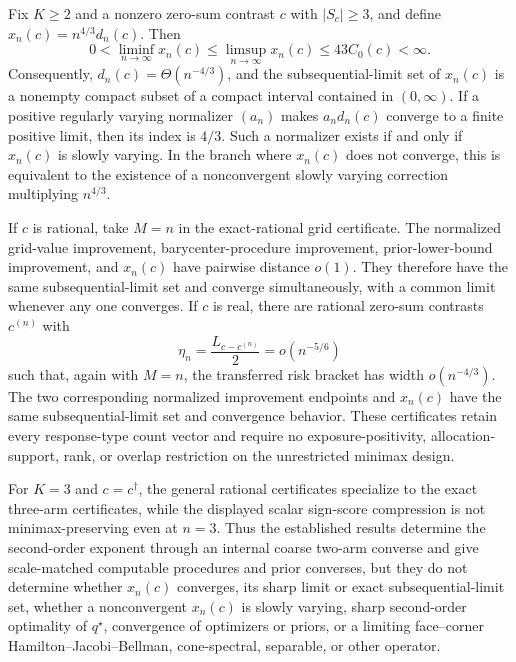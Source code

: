 Fix \(K\geq2\) and a nonzero zero-sum contrast \(c\) with \(|S_c|\geq3\), and define \(x_n(c)=n^{4/3}d_n(c)\). Then
\[
 0<\liminf_{n\to\infty}x_n(c)
 \leq\limsup_{n\to\infty}x_n(c)
 \leq43C_0(c)<\infty.
\]
Consequently, \(d_n(c)=\Theta(n^{-4/3})\), and the subsequential-limit set of \(x_n(c)\) is a nonempty compact subset of a compact interval contained in \((0,\infty)\). If a positive regularly varying normalizer \((a_n)\) makes \(a_nd_n(c)\) converge to a finite positive limit, then its index is \(4/3\). Such a normalizer exists if and only if \(x_n(c)\) is slowly varying. In the branch where \(x_n(c)\) does not converge, this is equivalent to the existence of a nonconvergent slowly varying correction multiplying \(n^{4/3}\).

If \(c\) is rational, take \(M=n\) in the exact-rational grid certificate. The normalized grid-value improvement, barycenter-procedure improvement, prior-lower-bound improvement, and \(x_n(c)\) have pairwise distance \(o(1)\). They therefore have the same subsequential-limit set and converge simultaneously, with a common limit whenever any one converges. If \(c\) is real, there are rational zero-sum contrasts \(c^{(n)}\) with
\[
 \eta_n=\frac{L_{c-c^{(n)}}}{2}=o(n^{-5/6})
\]
such that, again with \(M=n\), the transferred risk bracket has width \(o(n^{-4/3})\). The two corresponding normalized improvement endpoints and \(x_n(c)\) have the same subsequential-limit set and convergence behavior. These certificates retain every response-type count vector and require no exposure-positivity, allocation-support, rank, or overlap restriction on the unrestricted minimax design.

For \(K=3\) and \(c=c^\dagger\), the general rational certificates specialize to the exact three-arm certificates, while the displayed scalar sign-score compression is not minimax-preserving even at \(n=3\). Thus the established results determine the second-order exponent through an internal coarse two-arm converse and give scale-matched computable procedures and prior converses, but they do not determine whether \(x_n(c)\) converges, its sharp limit or exact subsequential-limit set, whether a nonconvergent \(x_n(c)\) is slowly varying, sharp second-order optimality of \(q^\star\), convergence of optimizers or priors, or a limiting face--corner Hamilton--Jacobi--Bellman, cone-spectral, separable, or other operator.